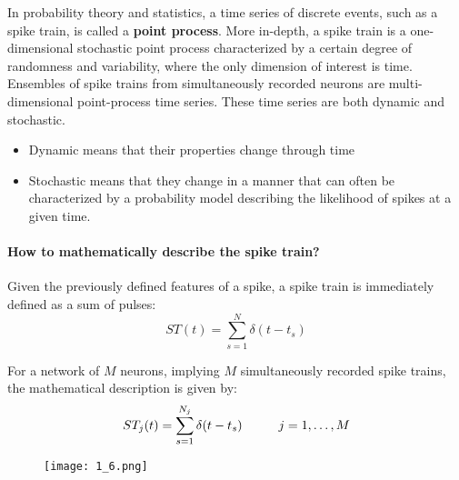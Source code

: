 In probability theory and statistics, a time series of discrete events,
such as a spike train, is called a \textbf{point process}. More
in-depth, a spike train is a one-dimensional stochastic point process characterized by a
certain degree of randomness and variability, where the only dimension of
interest is time.\\
Ensembles of spike trains from simultaneously recorded neurons are multi-
dimensional point-process time series. These time series are both dynamic
and stochastic.

\begin{itemize}
    \item Dynamic means that their properties change through time
    \item Stochastic means that they change in a manner that can often be
          characterized by a probability model describing the likelihood of spikes
          at a given time.
\end{itemize}

\paragraph{How to mathematically describe the spike train?} Given the
previously defined features of a spike, a spike train is immediately
defined as a sum of pulses:
\begin{equation*}
    ST(t) = \sum_{s=1}^N\delta(t-t_s)
\end{equation*}

For a network of \(M\) neurons, implying \(M\) simultaneously recorded
spike trains, the mathematical description is given by:
\begin{equation*}
    ST_j(t) = \sum_{s=1}^{N_j}\delta(t-t_s) \hspace{1 cm} j=1,\dots,M
\end{equation*}

\begin{figure}[h]
    \centering
    \texttt{[image: 1\_6.png]}
\end{figure}
\newpage
